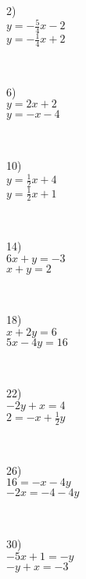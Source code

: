 \begin{multicols}{4}
  2)\\
  $y = - \frac{5}{4} x - 2$\\
	$y = - \frac{1}{4} x + 2$\par
  ~\par
  6)\\
  $y = 2 x + 2$\\
	$y = - x - 4$\par
  ~\par
  10)\\
  $y = \frac{1}{2} x + 4$\\
	$y = \frac{1}{2} x + 1$\par
  ~\par
  14)\\
  $6 x + y = - 3$\\
	$x + y = 2$\par
  ~\par
  18)\\
  $x + 2 y = 6$\\
	$5 x - 4 y = 16$\par
  ~\par
  22)\\
  $- 2 y + x = 4$\\
	$2 = - x + \frac{1}{2} y$\par
  ~\par
  26)\\
  $16 = - x - 4 y$\\
	$- 2 x = - 4 - 4 y$\par
  ~\par
  30)\\
  $- 5 x + 1 = - y$\\
	$- y + x = - 3$\par
  ~\par
	~\par
	~\par
	~\par
	

\end{multicols}
